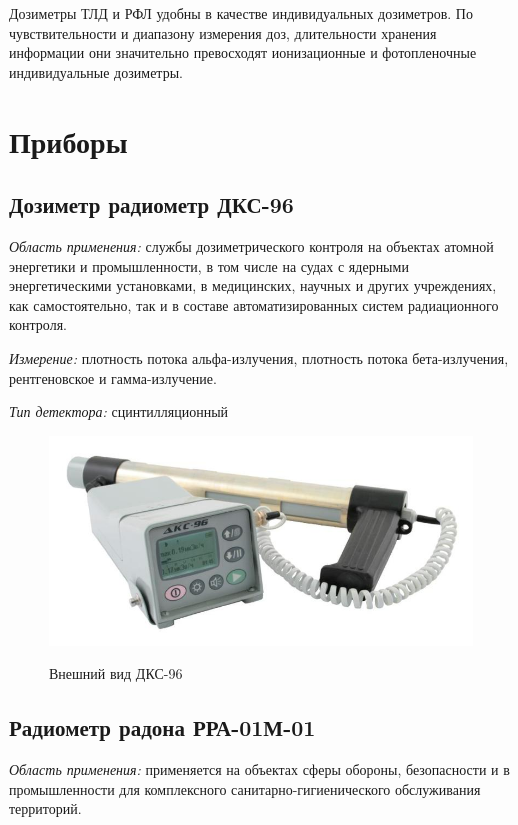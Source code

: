 \documentclass[14pt,pscyr,titlepage]{hedreport}
\begin{document}
		Дозиметры ТЛД и РФЛ удобны в качестве индивидуальных дозиметров. 
		По чувствительности и диапазону измерения доз, длительности хранения 
		информации они значительно превосходят ионизационные и фотопленочные 
		индивидуальные дозиметры. 

	\pagebreak

	\section{Приборы}
	\subsection{Дозиметр радиометр ДКС-96}
		\emph{Область применения:} службы дозиметрического контроля на объектах 
		атомной энергетики и промышленности, в том числе на судах с ядерными 
		энергетическими установками, в медицинских, научных и других 
		учреждениях, как самостоятельно, так и в составе автоматизированных 
		систем радиационного контроля.
		
		\emph{Измерение:} плотность потока альфа-излучения, плотность потока 
			бета-излучения, рентгеновское и гамма-излучение. 

		\emph{Тип детектора:} сцинтилляционный

		\begin{figure}[h!]
			\center
			\includegraphics[width=.8\textwidth]{DKS-96} \\
			\caption{Внешний вид ДКС-96}
		\end{figure}

	\pagebreak

	\subsection{Радиометр радона РРА-01М-01}
		\emph{Область применения:} применяется на объектах сферы обороны, 
			безопасности и в промышленности для комплексного 
			санитарно-гигиенического обслуживания территорий.
\end{document}
